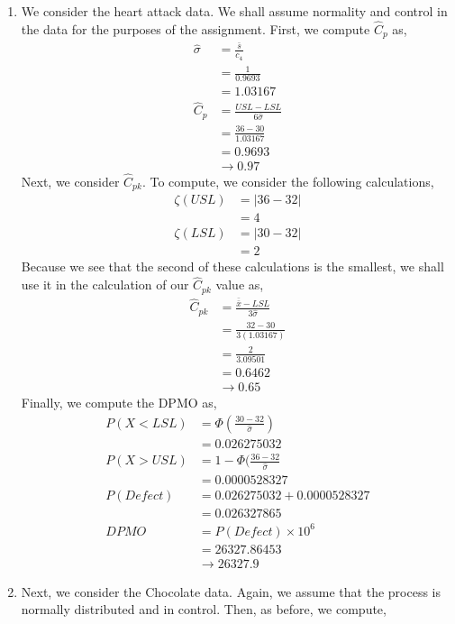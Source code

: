 \documentclass[letterpaper,10pt]{article}
\begin{document}
\begin{enumerate}
\item We consider the heart attack data. We shall assume normality and control in the data for the purposes of the assignment. First, we compute $\hat{C}_p$ as,
\begin{align*}
\hat{\sigma} &= \frac{\bar{s}}{c_4}\\
&=\frac{1}{0.9693}\\
&=1.03167\\
\hat{C}_p&=\frac{USL-LSL}{6\hat{\sigma}}\\
&=\frac{36-30}{1.03167}\\
&=0.9693\\
&\to 0.97
\end{align*}
Next, we consider $\hat{C}_{pk}$. To compute, we consider the following calculations,
\begin{align*}
\zeta(USL) &= |36-32|\\
&= 4\\
\zeta(LSL) &= |30-32|\\
&=2
\end{align*}
Because we see that the second of these calculations is the smallest, we shall use it in the calculation of our $\hat{C}_{pk}$ value as,
\begin{align*}
\hat{C}_{pk} &= \frac{\bar{\bar{x}}-LSL}{3\hat{\sigma}}\\
&=\frac{32-30}{3(1.03167)}\\
&=\frac{2}{3.09501}\\
&=0.6462\\
&\to 0.65
\end{align*}
Finally, we compute the DPMO as,
\begin{align*}
P(X<LSL) &=\Phi(\frac{30-32}{\hat{\sigma}})\\
&=0.026275032\\
P(X>USL) &= 1-\Phi(\frac{36-32}{\hat{\sigma}}\\
&=0.0000528327\\
P(Defect) &= 0.026275032+0.0000528327\\
&=0.026327865\\
DPMO &= P(Defect)\times 10^6\\
&=26327.86453\\
&\to 26327.9
\end{align*}
\item Next, we consider the Chocolate data. Again, we assume that the process is normally distributed and in control. Then, as before, we compute,
\begin{align*}

\end{align*}
\end{enumerate}
\end{document}
